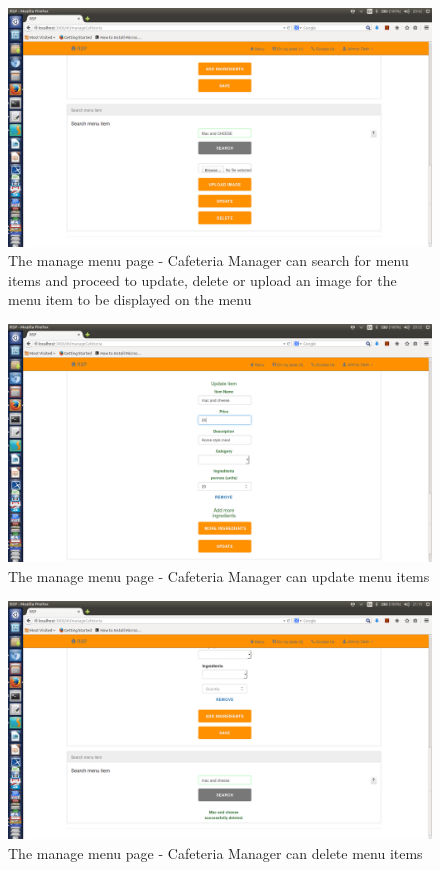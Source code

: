\documentclass[a4paper,12pt]{report}
\begin{document}
\begin{figure}[H]
  \centering
    \includegraphics[width=1.0\textwidth]{screenshots/searchMenuItem.png}
    \caption{The manage menu page - Cafeteria Manager can search for menu items and proceed to update, delete or upload an image for the menu item to be displayed on the menu}
\end{figure}

\begin{figure}[H]
  \centering
    \includegraphics[width=1.0\textwidth]{screenshots/updateMenu.png}
    \caption{The manage menu page - Cafeteria Manager can update menu items}
\end{figure}

\begin{figure}[H]
  \centering
    \includegraphics[width=1.0\textwidth]{screenshots/deleteMenu.png}
    \caption{The manage menu page - Cafeteria Manager can delete menu items}
\end{figure}
\end{document}
